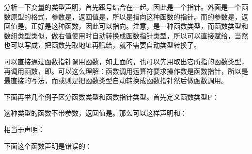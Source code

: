 


分析一下变量的类型声明，首先跟\BookCode{*}号结合在一起，因此是一个指针。外面是一个函数原型的格式，参数是，返回值是，所以是指向这种函数的指针。而的参数是，返回值是，正好是这种函数，因此可以指向。注意，是一种函数类型，而函数类型和数组类型类似，做右值使用时自动转换成函数指针类型，所以可以直接赋给，当然也可以写成，把函数先取地址再赋给，就不需要自动类型转换了。



可以直接通过函数指针调用函数，如上面的，也可以先用取出它所指的函数类型，再调用函数，即。可以这么理解：函数调用运算符\BookCode{(\BookSplit{})\BookSplit{}}要求操作数是函数指针，所以是最直接的写法，而或则是把函数类型自动转换成函数指针然后做函数调用。



下面再举几个例子区分函数类型和函数指针类型。首先定义函数类型F：




这种类型的函数不带参数，返回值是。那么可以这样声明和：




相当于声明：




下面这个函数声明是错误的：


